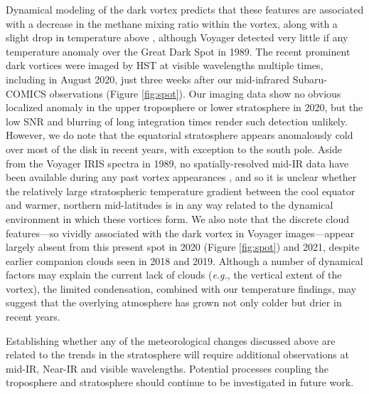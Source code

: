 \documentclass[twocolumn,10pt]{aastex631}
\begin{document}
Dynamical modeling of the dark vortex predicts that these features are associated with a decrease in the methane mixing ratio within the vortex, along with a slight drop in temperature above \citep{stratman2001epic,hadland2020epic}, although Voyager detected very little if any temperature anomaly over the Great Dark Spot \citep{conrath1989neptune} in 1989. The recent prominent dark vortices were imaged by HST at visible wavelengths multiple times, including in August 2020, just three weeks after our mid-infrared Subaru-COMICS observations (Figure \ref{fig:spot}). Our imaging data show no obvious localized anomaly in the upper troposphere or lower stratosphere in 2020, but the low SNR and blurring of long integration times render such detection unlikely.  However, we do note that the equatorial stratosphere appears anomalously cold over most of the disk in recent years, with exception to the south pole. Aside from the Voyager IRIS spectra in 1989, no spatially-resolved mid-IR data have been available during any past vortex appearances \citep[\textit{e.g.}, see][]{wong2018new}, and so it is unclear whether the relatively large stratospheric temperature gradient between the cool equator and warmer, northern mid-latitudes is in any way related to the dynamical environment in which these vortices form. We also note that the discrete cloud features---so vividly associated with the dark vortex in Voyager images---appear largely absent from this present spot in 2020 (Figure \ref{fig:spot}) and 2021, despite earlier companion clouds seen in 2018 and 2019. Although a number of dynamical factors may explain the current lack of clouds (\textit{e.g.}, the vertical extent of the vortex), the limited condensation, combined with our temperature findings, may suggest that the overlying atmosphere has grown not only colder but drier in recent years. 

Establishing whether any of the meteorological changes discussed above are related to the trends in the stratosphere will require additional observations at mid-IR, Near-IR and visible wavelengths. Potential processes coupling the troposphere and stratosphere should continue to be investigated in future work.



\end{document}
